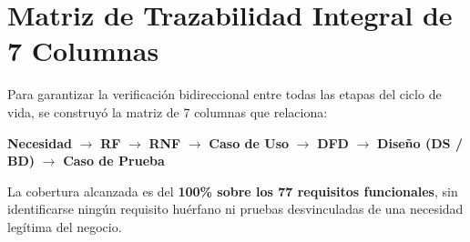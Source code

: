 \section{Matriz de Trazabilidad Integral de 7 Columnas}
Para garantizar la verificaci\'on bidireccional entre todas las etapas del ciclo de vida, se construy\'o la matriz de 7 columnas que relaciona:
\begin{center}
\textbf{Necesidad} $\longrightarrow$ \textbf{RF} $\longrightarrow$ \textbf{RNF} $\longrightarrow$ \textbf{Caso de Uso} $\longrightarrow$ \textbf{DFD} $\longrightarrow$ \textbf{Dise\~no (DS / BD)} $\longrightarrow$ \textbf{Caso de Prueba}
\end{center}
La cobertura alcanzada es del \textbf{100\% sobre los 77 requisitos funcionales}, sin identificarse ning\'un requisito hu\'erfano ni pruebas desvinculadas de una necesidad leg\'itima del negocio.

